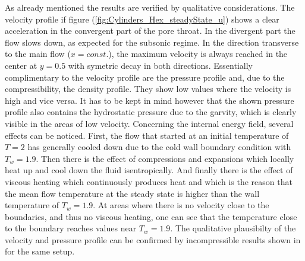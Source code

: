 \documentclass[11pt,a4paper,twoside]{report}
\begin{document}
As already mentioned the results are verified by qualitative considerations. 
The velocity profile if figure (\ref{fig:Cylinders_Hex_steadyState_u}) shows a clear acceleration in the convergent part of the pore throat. In the divergent part the flow slows down, as expected for the subsonic regime. In the direction transverse to the main flow ($x=const.$), the maximum velocity is always reached in the center at $y=0.5$ with symetric decay in both directions. 
Essentially complimentary to the velocity profile are the pressure profile and, due to the compressibility, the density profile. They show low values where the velocity is high and vice versa. It has to be kept in mind however that the shown pressure profile also contains the hydrostatic pressure due to the garvity, which is clearly visible in the areas of low velocity.
Concerning the internal energy field, several effects can be noticed. First, the flow that started at an initial temperature of $T=2$ has generally cooled down due to the cold wall boundary condition with $T_w=1.9$. Then there is the effect of compressions and expansions which locally heat up and cool down the fluid isentropically. And finally there is the effect of viscous heating which continuously produces heat and which is the reason that the mean flow temperature at the steady state is higher than the wall temperature of $T_w=1.9$. At areas where there is no velocity close to the boundaries, and thus no viscous heating, one can see that the temperature close to the boundary reaches values near $T_w=1.9$. %
The qualitative plausibilty of the velocity and pressure profile can be confirmed by incompressible results shown in \cite{Zhu1999} for the same setup. 
 
\end{document}
